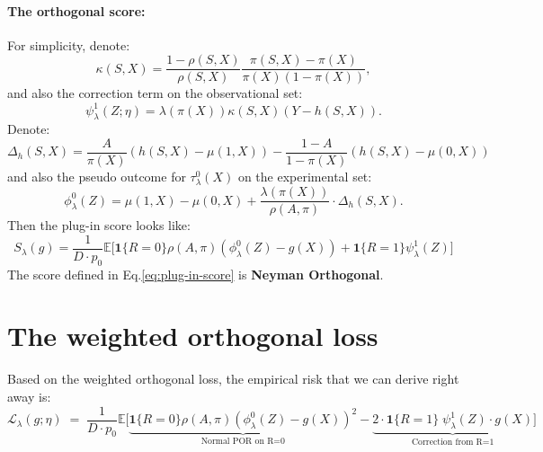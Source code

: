 \documentclass{article} %
\theoremstyle{plain} %
\theoremstyle{definition} %
\theoremstyle{remark} %
\begin{document}
\paragraph{The orthogonal score:}
For simplicity, denote:
\begin{equation}
    \kappa(S,X) = \frac{1-\rho(S,X)}{\rho(S,X)} \frac{\pi(S,X)-\pi(X)}{\pi(X)(1-\pi(X))},
\end{equation}
and also the correction term on the observational set:
\begin{equation}
    \psi_\lambda^1(Z;\eta)=\lambda(\pi(X)) \kappa(S,X) (Y-h(S,X)).
\end{equation}
Denote:
\begin{equation}
    \Delta_h(S,X) = \frac{A}{\pi(X)}(h(S,X)-\mu(1,X)) - \frac{1-A}{1-\pi(X)}(h(S,X)-\mu(0,X))
\end{equation}
and also the pseudo outcome for $\tau^0_\lambda(X)$ on the experimental set:
\begin{equation}
    \label{eq:def-phi-lambda}
    \phi^0_\lambda(Z)=\mu(1,X)-\mu(0,X)+\frac{\lambda(\pi(X))}{\rho(A,\pi)}\cdot \Delta_h(S,X).
\end{equation}
Then the plug-in score looks like:
\begin{equation}
\label{eq:plug-in-score}
    S_\lambda(g) = \frac{1}{D\cdot p_0}\mathbb{E}\Big[\mathbf{1}\{R=0\}\rho(A,\pi)(\phi_\lambda^0(Z)-g(X)) + \mathbf{1}\{R=1\}\psi_\lambda^1(Z)\Big]
\end{equation}
The score defined in Eq.\ref{eq:plug-in-score} is \textbf{Neyman Orthogonal}.

\section{The weighted orthogonal loss}
Based on the weighted orthogonal loss, the empirical risk that we can derive right away is:
\begin{equation}
    \label{eq:ortho-loss}
    \mathcal{L}_\lambda(g; \eta) \;=\;\frac{1}{D\cdot p_0}\mathbb{E}\Big[\underbrace{\mathbf{1}\{R=0\}\rho(A,\pi)(\phi_\lambda^0(Z)-g(X))^2}_{\text{Normal POR on R=0}} - \underbrace{2\cdot\mathbf{1}\{R=1\}\;\psi_\lambda^1(Z) \cdot g(X)}_{\text{Correction from R=1}}\Big]
\end{equation}
\end{document}
